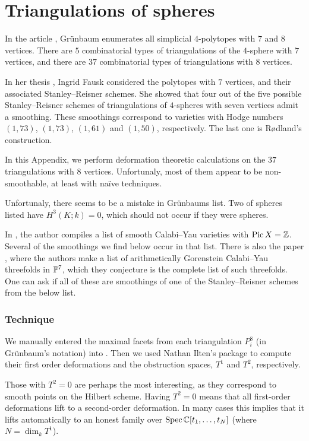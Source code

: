 \chapter{Triangulations of spheres}
\label{sec:spheres8}

In the article \cite{grunbaum_enumeration}, Grünbaum enumerates all simplicial $4$-polytopes with $7$ and $8$ vertices. There are $5$ combinatorial types of triangulations of the $4$-sphere with $7$ vertices, and there are $37$ combinatorial types of triangulations with $8$ vertices.

In her thesis \cite{fausk_thesis}, Ingrid Fausk considered the polytopes with $7$ vertices, and their associated Stanley--Reisner schemes. She showed that four out of the five possible Stanley--Reisner schemes of triangulations of $4$-spheres with seven vertices admit a smoothing. These smoothings correspond to \CY varieties with Hodge numbers $(1,73)$, $(1,73)$, $(1,61)$ and $(1,50)$, respectively. The last one is Rødland's construction.

In this Appendix, we perform deformation theoretic calculations on the $37$ triangulations with $8$ vertices. Unfortunaly, most of them appear to be non-smoothable, at least with naïve techniques.

Unfortunaly, there seems to be a mistake in Grünbaums list. Two of spheres listed have $H^3(K;k)=0$, which should not occur if they were spheres.

In \cite{kapustka_delpezzo}, the author compiles a list of smooth Calabi--Yau varieties with $\Pic X = \Z$. Several of the smoothings we find below occur in that list. There is also the paper \cite{MR3591944}, where the authors make a list of arithmetically Gorenstein Calabi--Yau threefolds in $\P^7$, which they conjecture is the complete list of such threefolds. One can ask if all of these are smoothings of one of the Stanley--Reisner schemes from the below list.

\subsection{Technique}

We manually entered the maximal facets from each triangulation $P_i^8$ (in Grünbaum's notation) into \MM. Then we used Nathan Ilten's package \cite{ilten_versaldeformations} to compute their first order deformations and the obstruction spaces, $T^1$ and $T^2$, respectively.

Those with $T^2=0$ are perhaps the most interesting, as they correspond to smooth points on the Hilbert scheme. Having $T^2=0$ means that all first-order deformations lift to a second-order deformation. In many cases this implies that it lifts automatically to an honest family over $\Spec \C[t_1,\ldots,t_N]$ (where $N=\dim_k T^1$).


